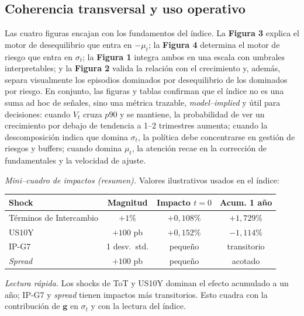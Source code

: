 \documentclass[11pt,a4paper]{article}
\numberwithin{equation}{section}
\newcommand{\vect}[1]{\boldsymbol{#1}}
\begin{document}
\subsection*{Coherencia transversal y uso operativo}
Las cuatro figuras encajan con los fundamentos del índice. La \textbf{Figura 3} explica el motor de desequilibrio que entra en $-\mu_t$; la \textbf{Figura 4} determina el motor de riesgo que entra en $\sigma_t$; la \textbf{Figura 1} integra ambos en una escala con umbrales interpretables; y la \textbf{Figura 2} valida la relación con el crecimiento y, además, separa visualmente los episodios dominados por desequilibrio de los dominados por riesgo. En conjunto, las figuras y tablas confirman que el índice no es una suma ad hoc de señales, sino una métrica trazable, \textit{model–implied} y útil para decisiones: cuando $V_t$ cruza $p90$ y se mantiene, la probabilidad de ver un crecimiento por debajo de tendencia a 1–2 trimestres aumenta; cuando la descomposición indica que domina $\sigma_t$, la política debe concentrarse en gestión de riesgos y buffers; cuando domina $\mu_t$, la atención recae en la corrección de fundamentales y la velocidad de ajuste.

\noindent\textit{Mini–cuadro de impactos (resumen).} Valores ilustrativos usados en el índice:
\begin{table}[h]
\centering
\small
\begin{tabular}{lccc}
\toprule
\textbf{Shock} & \textbf{Magnitud} & \textbf{Impacto $t{=}0$} & \textbf{Acum. 1 año} \\
\midrule
Términos de Intercambio & $+1\%$    & $+0{,}108\%$ & $+1{,}729\%$ \\
US10Y                    & $+100$ pb & $+0{,}152\%$ & $-1{,}114\%$ \\
IP-G7                    & 1 desv.\ std. & pequeño & transitorio \\
\emph{Spread}            & $+100$ pb & pequeño & acotado \\
\bottomrule
\end{tabular}
\end{table}

\noindent\textit{Lectura rápida.} Los shocks de ToT y US10Y dominan el efecto acumulado a un año; IP-G7 y \emph{spread} tienen impactos más transitorios. Esto cuadra con la contribución de $\vect{g}$ en $\sigma_t$ y con la lectura del índice.








\newpage
\end{document}
